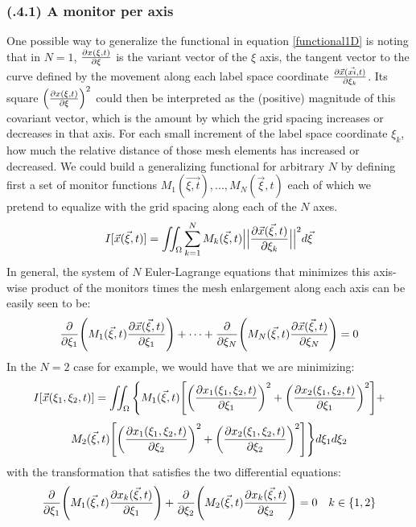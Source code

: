 \documentclass[11pt, a4paper]{article} %
\begin{document}
\subsubsection*{\bf (\textgamma.4.1) A monitor per axis}
One possible way to generalize the functional in equation \eqref{functional1D} is noting that in $N=1$, $\pdv{x(\xi,t)}{\xi}$ is the variant vector of the $\xi$ axis, the tangent vector to the curve defined by the movement along each label space coordinate $\pdv{\vec{x}(\vec{xi},t)}{\xi_k}$. Its square $\qty(\pdv{x(\xi,t)}{\xi})^2$ could then be interpreted as the (positive) magnitude of this covariant vector, which is the amount by which the grid spacing increases or decreases in that axis. For each small increment of the label space coordinate $\xi_k$, how much the relative distance of those mesh elements has increased or decreased. We could build a generalizing functional for arbitrary $N$ by defining first a set of monitor functions $M_1(\vec{\xi,t}),...,M_N(\vec{\xi},t)$ each of which we pretend to equalize with the grid spacing along each of the $N$ axes.
\begin{equation}
I[\vec{x}(\vec{\xi},t)]=\iint_\Omega \sum_{k=1}^N M_k(\vec{\xi},t) \Big|\Big|\pdv{\vec{x}(\vec{\xi},t)}{\xi_k}\Big|\Big|^2 d\vec{\xi}
\end{equation}
In general, the system of $N$ Euler-Lagrange equations that minimizes this axis-wise product of the monitors times the mesh enlargement along each axis can be easily seen to be:
\begin{equation}
\pdv{}{\xi_1} \qty( M_1(\vec{\xi},t)\pdv{\vec{x}(\vec{\xi},t)}{\xi_1} )+\cdots+\pdv{}{\xi_N}\qty( M_N(\vec{\xi},t)\pdv{\vec{x}(\vec{\xi},t)}{\xi_N} )=0
\end{equation}
In the $N=2$ case for example, we would have that we are minimizing:
\begin{equation}
I[\vec{x}(\xi_1, \xi_2,t)]=\iint_\Omega \Bigg\{M_1(\vec{\xi},t) \qty[\qty(\pdv{x_1(\xi_1,\xi_2,t)}{\xi_1})^2+\qty(\pdv{x_2(\xi_1,\xi_2,t)}{\xi_1})^2] +
\end{equation}
$$
M_2(\vec{\xi},t) \qty[\qty(\pdv{x_1(\xi_1,\xi_2,t)}{\xi_2})^2+\qty(\pdv{x_2(\xi_1,\xi_2,t)}{\xi_2})^2]\Bigg\} d\xi_1d\xi_2
$$
with the transformation that satisfies the two differential equations:
\begin{equation}
\pdv{}{\xi_1} \qty( M_1(\vec{\xi},t)\pdv{x_k(\vec{\xi},t)}{\xi_1} )+\pdv{}{\xi_2}\qty( M_2(\vec{\xi},t)\pdv{x_k(\vec{\xi},t)}{\xi_2} )=0 \quad k\in\{1,2\}
\end{equation}
\end{document}
